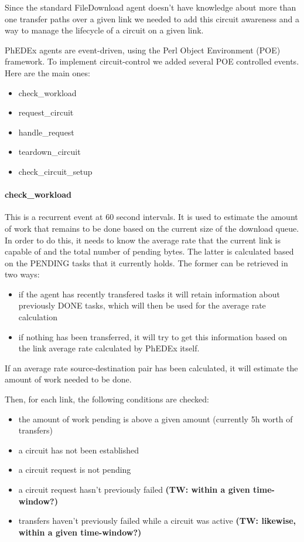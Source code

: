 Since the standard FileDownload agent doesn't have knowledge about more than one
transfer paths over a given link we needed to add this circuit awareness and a
way to manage the lifecycle of a circuit on a given link.

PhEDEx agents are event-driven, using the Perl Object Environment (POE\cite{POE}) framework.
To implement circuit-control we added several POE controlled events. Here are the main ones:

\begin{itemize}
  \item check\_workload
  \item request\_circuit
  \item handle\_request
  \item teardown\_circuit
  \item check\_circuit\_setup
\end{itemize}

\paragraph{check\_workload}

This is a recurrent event at 60 second intervals. It is used to estimate the 
amount of work that remains to be done based on the current size of the download
 queue. In order to do this, it needs to know the average rate that the current 
link is capable of and the total number of pending bytes. The latter is calculated
based on the PENDING tasks that it currently holds. The former can be retrieved
in two ways: 

\begin{itemize}
  \item if the agent has recently transfered tasks it will retain information about
previously DONE tasks, which will then be used for the average rate calculation
  \item if nothing has been transferred, it will try to get this information based
on the link average rate calculated by PhEDEx itself.
\end{itemize}

If an average rate source-destination pair has been calculated, it will estimate
the amount of work needed to be done.

Then, for each link, the following conditions are checked:
\begin{itemize}
  \item the amount of work pending is above a given amount (currently 5h worth of transfers) 
  \item a circuit has not been established
  \item a circuit request is not pending
  \item a circuit request hasn't previously failed \textbf{(TW: within a given time-window?)}
  \item transfers haven't previously failed while a circuit was active \textbf{(TW: likewise, within a given time-window?)}
\end{itemize}

